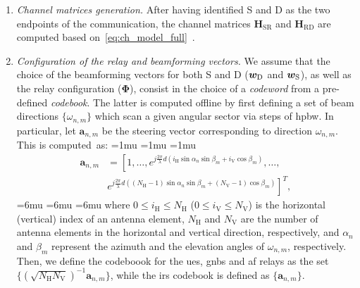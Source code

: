 \begin{enumerate}
    \item \emph{Channel matrices generation.} 
After having identified S and D as the two endpoints of the communication, the channel matrices $\bm{H}_{\textrm {SR}}$ and $\bm{H}_{\textrm {RD}}$ are computed based on~\eqref{eq:ch_model_full}~\cite{3gpp.38.901}. 

\item \emph{Configuration of the relay and beamforming vectors.}
We assume that the choice of the beamforming vectors for both S and D ($\bm{w}_{\textrm D}$ and $\bm{w}_{\textrm S}$), as well as the relay configuration ($\bm{\Phi}$), consist in the choice of a \emph{codeword} from a pre-defined \emph{codebook}. The latter is computed offline by first defining a set of beam directions $\{ \omega_{n, m} \}$ which scan a given angular sector via steps of \gls{hpbw}. In particular, let $\bm{a}_{n,m}$ be the steering vector corresponding to direction $\omega_{n, m}$. This is computed~as:
\medmuskip=1mu
\thinmuskip=1mu
\thickmuskip=1mu
\begin{equation}
\begin{aligned}
    \bm{a}_{n, m} & =  \left[ 1,\ldots, e^{j\frac{2\pi}{\lambda}d\left(i_{\mathrm H}\sin\alpha_n\sin\beta_m+i_{\mathrm V}\cos\beta_m\right)}, \ldots, \right. \\ 
    & \left. e^{j\frac{2\pi}{\lambda}d\left((N_{\mathrm H}-1)\sin\alpha_n\sin\beta_m+(N_{\mathrm V}-1)\cos\beta_m\right)}\right]^T,
\end{aligned}
\end{equation}
\medmuskip=6mu
\thinmuskip=6mu
\thickmuskip=6mu
where $0 \leq i_{\mathrm H} \leq N_{\mathrm H}$ ($0 \leq i_{\mathrm V} \leq N_{\mathrm V}$) is the horizontal (vertical) index of an antenna element, $N_{\mathrm H}$ and $N_{\mathrm V}$ are the number of antenna elements in the horizontal and vertical direction, respectively, and $\alpha_n$ and $\beta_m$ represent the azimuth and the elevation angles of $\omega_{n, m}$, respectively. Then, we define the codeboook for the \glspl{ue}, \glspl{gnb} and \gls{af} relays as the set $\{ \left( \sqrt{N_{\mathrm H} N_{\mathrm V}} \right)^{-1} \bm{a}_{n, m} \}$, while the \gls{irs} codebook is defined as $\{ \bm{a}_{n, m} \}$. 


\end{enumerate}

